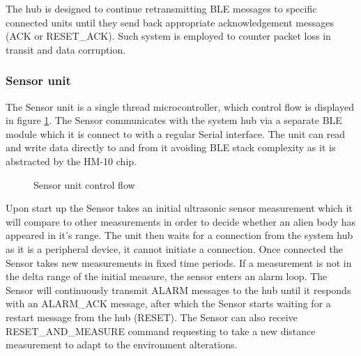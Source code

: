 \documentclass[conference]{IEEEtran}
\begin{document}
The hub is designed to continue retransmitting BLE messages to specific connected units until they send back appropriate acknowledgement messages (ACK or RESET\_ACK). Such system is employed to counter packet loss in transit and data corruption.

\subsubsection{Sensor unit}
The Sensor unit is a single thread microcontroller, which control flow is displayed in figure \ref{fig:sensor-control}. The Sensor communicates with the system hub via a separate BLE module which it is connect to with a regular Serial interface. The unit can read and write data directly to and from it avoiding BLE stack complexity as it is abstracted by the HM-10 chip. 

\begin{figure}[!htb]
	\caption{\label{fig:sensor-control} Sensor unit control flow}
\end{figure}

Upon start up the Sensor takes an initial ultrasonic sensor measurement which it will compare to other measurements in order to decide whether an alien body has appeared in it's range. The unit then waits for a connection from the system hub as it is a peripheral device, it cannot initiate a connection. Once connected the Sensor takes new measurements in fixed time periods. If a measurement is not in the delta range of the initial measure, the sensor enters an alarm loop. The Sensor will continuously transmit ALARM messages to the hub until it responds with an ALARM\_ACK message, after which the Sensor starts waiting for a restart message from the hub (RESET). The Sensor can also receive RESET\_AND\_MEASURE command requesting to take a new distance measurement to adapt to the environment alterations. 
\end{document}
